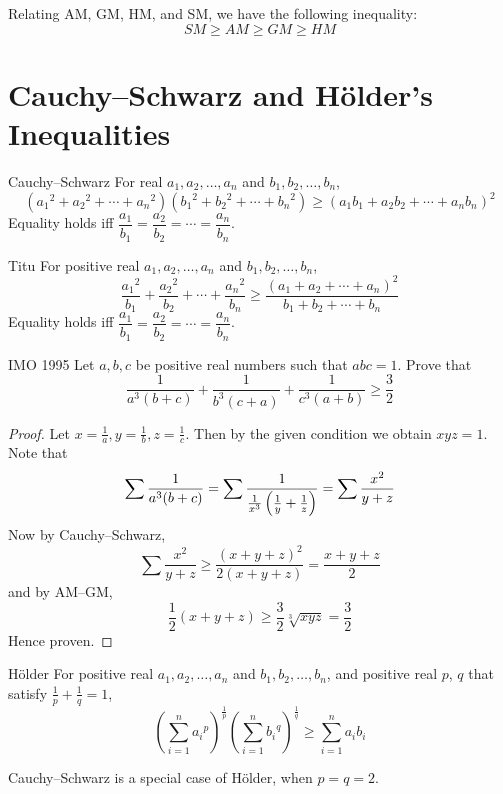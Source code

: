 Relating AM, GM, HM, and SM, we have the following inequality:
\[ SM \ge AM \ge GM \ge HM \]

\section{Cauchy--Schwarz and H\"{o}lder’s Inequalities}
\begin{thrm}{Cauchy--Schwarz}{} 
For real $a_1, a_2, \dots, a_n$ and $b_1, b_2, \dots, b_n$, 
\begin{equation} ({a_1}^2 + {a_2}^2 + \cdots + {a_n}^2)({b_1}^2 + {b_2}^2 + \cdots + {b_n}^2) \ge (a_1 b_1 + a_2 b_2 + \cdots + a_n b_n)^2 \end{equation} 
Equality holds iff $\dfrac{a_1}{b_1} = \dfrac{a_2}{b_2} = \cdots = \dfrac{a_n}{b_n}$. 
\end{thrm}

\begin{thrm}{Titu}{}
For positive real $a_1, a_2, \dots, a_n$ and $b_1, b_2, \dots, b_n$, 
\begin{equation} \frac{{a_1}^2}{b_1} + \frac{{a_2}^2}{b_2} + \cdots + \frac{{a_n}^2}{b_n} \ge \frac{(a_1 + a_2 + \cdots + a_n)^2}{b_1 + b_2 + \cdots + b_n} \end{equation} 
Equality holds iff $\dfrac{a_1}{b_1} = \dfrac{a_2}{b_2} = \cdots = \dfrac{a_n}{b_n}$. 
\end{thrm}

\begin{exmp}{IMO 1995}{}
Let $a, b, c$ be positive real numbers such that $abc = 1$. Prove that
\[ \frac{1}{a^3(b+c)} + \frac{1}{b^3(c+a)} + \frac{1}{c^3(a+b)} \ge \frac{3}{2} \]
\end{exmp}
\begin{proof}
Let $x=\frac{1}{a}, y=\frac{1}{b}, z=\frac{1}{c}$. Then by the given condition we obtain $xyz = 1$. Note that
\[ \sum\frac{1}{a^3(b+c)} = \sum\frac{1}{\frac{1}{x^3}\left(\frac{1}{y}+\frac{1}{z}\right)} = \sum\frac{x^2}{y+z} \]
Now by Cauchy--Schwarz,
\[ \sum\frac{x^2}{y+z} \ge \frac{(x+y+z)^2}{2(x+y+z)} = \frac{x+y+z}{2} \]
and by AM--GM,
\[ \frac{1}{2}(x+y+z) \ge \frac{3}{2}\sqrt[3]{xyz} = \frac{3}{2} \]
Hence proven.
\end{proof}

\begin{thrm}{H\"{o}lder}{}
For positive real $a_1, a_2, \dots, a_n$ and $b_1, b_2, \dots, b_n$, and positive real $p$, $q$ that satisfy $\frac{1}{p} + \frac{1}{q} = 1$, 
\begin{equation} 
\left(\sum_{i=1}^{n} {a_i}^p\right)^{\frac{1}{p}} \left(\sum_{i=1}^{n} {b_i}^q\right)^{\frac{1}{q}} \ge \sum_{i=1}^{n} a_ib_i 
\end{equation} 
\end{thrm}
\begin{remark}
Cauchy--Schwarz is a special case of H\"{o}lder, when $p=q=2$.
\end{remark}

